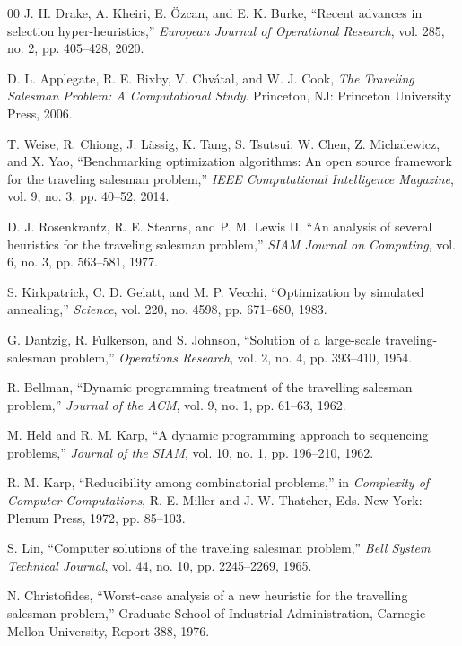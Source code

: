 \documentclass[conference]{IEEEtran}
\begin{document}
\begin{thebibliography}{00}
 J. H. Drake, A. Kheiri, E. \"Ozcan, and E. K. Burke,
``Recent advances in selection hyper-heuristics,''
\textit{European Journal of Operational Research}, vol. 285, no. 2, pp. 405--428, 2020.

 D. L. Applegate, R. E. Bixby, V. Chv\'atal, and W. J. Cook,
\textit{The Traveling Salesman Problem: A Computational Study}.
Princeton, NJ: Princeton University Press, 2006.

 T. Weise, R. Chiong, J. L\"assig, K. Tang, S. Tsutsui, W. Chen, Z. Michalewicz, and X. Yao,
``Benchmarking optimization algorithms: An open source framework for the traveling salesman problem,''
\textit{IEEE Computational Intelligence Magazine}, vol. 9, no. 3, pp. 40--52, 2014.

 D. J. Rosenkrantz, R. E. Stearns, and P. M. Lewis II,
``An analysis of several heuristics for the traveling salesman problem,''
\textit{SIAM Journal on Computing}, vol. 6, no. 3, pp. 563--581, 1977.

 S. Kirkpatrick, C. D. Gelatt, and M. P. Vecchi,
``Optimization by simulated annealing,''
\textit{Science}, vol. 220, no. 4598, pp. 671--680, 1983.

 G. Dantzig, R. Fulkerson, and S. Johnson,
``Solution of a large-scale traveling-salesman problem,''
\textit{Operations Research}, vol. 2, no. 4, pp. 393--410, 1954.

 R. Bellman,
``Dynamic programming treatment of the travelling salesman problem,''
\textit{Journal of the ACM}, vol. 9, no. 1, pp. 61--63, 1962.

 M. Held and R. M. Karp,
``A dynamic programming approach to sequencing problems,''
\textit{Journal of the SIAM}, vol. 10, no. 1, pp. 196--210, 1962.

 R. M. Karp,
``Reducibility among combinatorial problems,''
in \textit{Complexity of Computer Computations}, R. E. Miller and J. W. Thatcher, Eds.
New York: Plenum Press, 1972, pp. 85--103.

 S. Lin,
``Computer solutions of the traveling salesman problem,''
\textit{Bell System Technical Journal}, vol. 44, no. 10, pp. 2245--2269, 1965.

 N. Christofides,
``Worst-case analysis of a new heuristic for the travelling salesman problem,''
Graduate School of Industrial Administration, Carnegie Mellon University,
Report 388, 1976.


\end{thebibliography}
\end{document}
